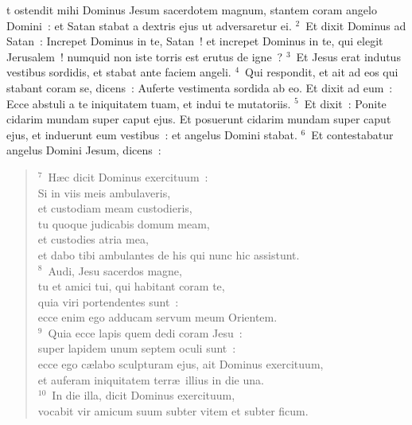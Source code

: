 \bchapter
{}t ostendit mihi Dominus Jesum sacerdotem magnum, stantem coram angelo Domini~: et Satan stabat a dextris ejus ut adversaretur ei.
${}^{2}$~Et dixit Dominus ad Satan~: Increpet Dominus in te, Satan~! et increpet Dominus in te, qui elegit Jerusalem~! numquid non iste torris est erutus de igne~?
${}^{3}$~Et Jesus erat indutus vestibus sordidis, et stabat ante faciem angeli.
${}^{4}$~Qui respondit, et ait ad eos qui stabant coram se, dicens~: Auferte vestimenta sordida ab eo. Et dixit ad eum~: Ecce abstuli a te iniquitatem tuam, et indui te mutatoriis.
${}^{5}$~Et dixit~: Ponite cidarim mundam super caput ejus. Et posuerunt cidarim mundam super caput ejus, et induerunt eum vestibus~: et angelus Domini stabat.
${}^{6}$~Et contestabatur angelus Domini Jesum, dicens~:
\begin{verse}${}^{7}$~H\ae c dicit Dominus exercituum~:\\ Si in viis meis ambulaveris,\\ et custodiam meam custodieris,\\ tu quoque judicabis domum meam,\\ et custodies atria mea,\\ et dabo tibi ambulantes de his qui nunc hic assistunt.\\
${}^{8}$~Audi, Jesu sacerdos magne,\\ tu et amici tui, qui habitant coram te,\\ quia viri portendentes sunt~:\\ ecce enim ego adducam servum meum Orientem.\\
${}^{9}$~Quia ecce lapis quem dedi coram Jesu~:\\ super lapidem unum septem oculi sunt~:\\ ecce ego c\ae labo sculpturam ejus, ait Dominus exercituum,\\ et auferam iniquitatem terr\ae\ illius in die una.\\
${}^{10}$~In die illa, dicit Dominus exercituum,\\ vocabit vir amicum suum subter vitem et subter ficum.\end{verse}




